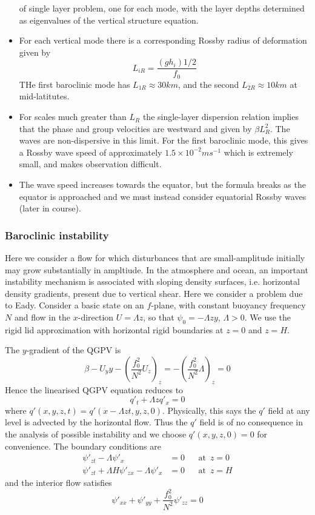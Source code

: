 \documentclass{jknotes}
\begin{document}
\begin{itemize}
		of single layer problem, one for each mode, with the layer depths
		determined as eigenvalues of the vertical structure equation.
	\item For each vertical mode there is a corresponding Rossby radius of
		deformation given by
		\begin{equation}
			L_{iR} = \frac{(gh_i){1/2}}{f_0}
		\end{equation}
		THe first baroclinic mode has $L_{1R} \approx 30 km$, and the second
		$L_{2R} \approx 10 km$ at mid-latitutes.
	\item For scales much greater than $L_{R}$ the single-layer dispersion
		relation implies that the phase and group velocities are westward and
		given by $\beta L_R^2$. The waves are non-dispersive in this limit.
		For the first baroclinic mode, this gives a Rossby wave speed of
		approximately $1.5 \times 10^{-2} ms^{-1}$ which is extremely small,
		and makes observation difficult.
	\item The wave speed increases towards the equator, but the formula breaks
		as the equator is approached and we must instead consider equatorial
		Rossby waves (later in course).
\end{itemize}

\subsubsection{Baroclinic instability}
Here we consider a flow for which disturbances that are small-amplitude
initially may grow substantially in ampltiude.  In the atmosphere and ocean,
an important instability mechanism is associated with sloping density
surfaces, i.e. horizontal density gradients, present due to vertical shear.
Here we consider a problem due to Eady. Consider a basic state on an
$f$-plane, with constant buoyancy frequency $N$ and flow in the $x$-direction
$U = \Lambda z$, so that $\psi_0 = -\Lambda z y$, $\Lambda > 0$. We use the
rigid lid approximation with horizontal rigid boundaries at $z=0$ and $z= H$.

The $y$-gradient of the QGPV is
\begin{equation}
	\beta - U_yy - (\frac{f_0^2}{N^2} U_z)_z = -(\frac{f_0^2}{N^2} \Lambda)_z
	= 0
\end{equation}
Hence the linearised QGPV equation reduces to
\begin{equation}
	q'_t + \Lambda z q'_x = 0
\end{equation}
where $q'(x,y,z,t) = q'(x-\Lambda z t, y, z, 0)$. Physically, this says the
$q'$ field at any level is advected by the horizontal flow. Thus the $q'$
field is of no consequence in the analysis of possible instability and we
choose $q'(x,y,z,0)= 0$ for convenience. The boundary conditions are
\begin{align}
	\psi'_{zt} - \Lambda \psi'_x &= 0 &&\text{at}\,\,\, z=0 \\
	\psi'_{zt}+\Lambda H \psi'_{zx} - \Lambda \psi'_x &= 0 &&\text{at} \,\,\,z
	=H
\end{align}
and the interior flow satisfies
\begin{equation}
	\psi'_{xx} + \psi'_{yy} + \frac{f_0^2}{N^2} \psi'_{zz} = 0
\end{equation}
\end{document}

